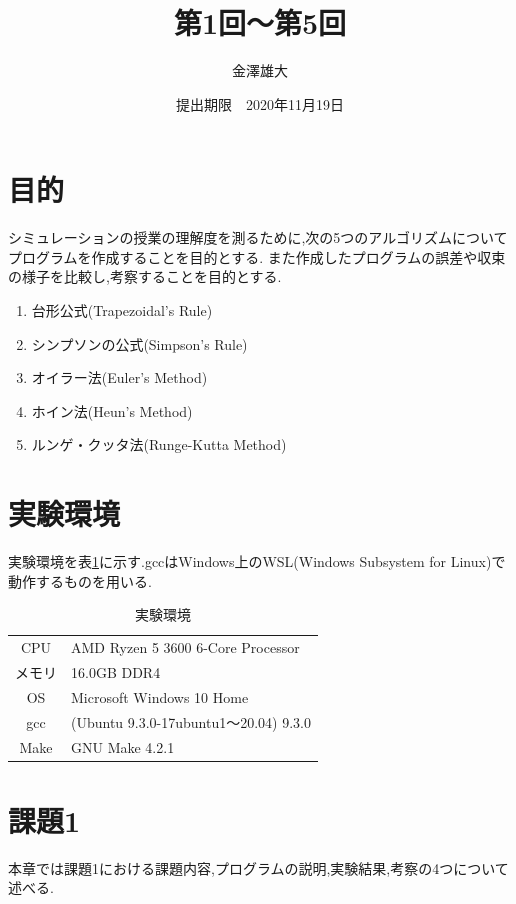 \documentclass[dvipdfmx]{jarticle}
\title{第1回～第5回}
\date{提出期限　2020年11月19日}
\author{金澤雄大}
\begin{document}
    \maketitle
    \thispagestyle{empty}
    \clearpage
    \addtocounter{page}{-1}
    \section{目的}
    シミュレーションの授業の理解度を測るために,次の5つのアルゴリズムについてプログラムを作成することを目的とする.
    また作成したプログラムの誤差や収束の様子を比較し,考察することを目的とする.
  \begin{enumerate}
  \item 台形公式(Trapezoidal's Rule)
  \item シンプソンの公式(Simpson's Rule)
  \item オイラー法(Euler's Method)
  \item ホイン法(Heun's Method)
  \item ルンゲ・クッタ法(Runge-Kutta Method)
  \end{enumerate}
  
    \section{実験環境}
      実験環境を表\ref{env}に示す.gccはWindows上のWSL(Windows Subsystem for Linux)で動作するものを用いる.
      \begin{table}[H]
        \caption{実験環境}
      \label{env}
      \begin{center}
          \begin{tabular}{c|l}\hline
            CPU & AMD Ryzen 5 3600 6-Core Processor \\ 
            メモリ & 16.0GB DDR4 \\
            OS & Microsoft Windows 10 Home \\
            gcc & (Ubuntu 9.3.0-17ubuntu1～20.04) 9.3.0 \\
            Make & GNU Make 4.2.1 \\ \hline
          \end{tabular}
      \end{center}
      \end{table}

    \section{課題1}
    本章では課題1における課題内容,プログラムの説明,実験結果,考察の4つについて述べる.
\end{document}
